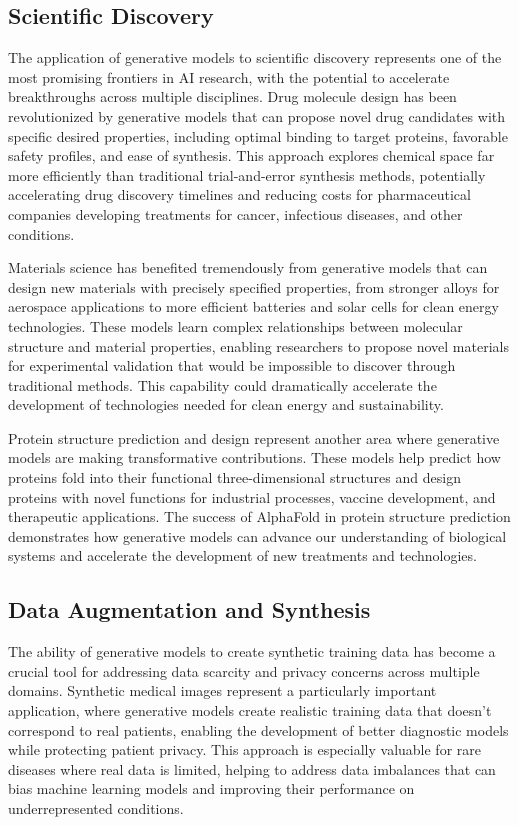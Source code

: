 \subsection{Scientific Discovery}

The application of generative models to scientific discovery represents one of the most promising frontiers in AI research, with the potential to accelerate breakthroughs across multiple disciplines. Drug molecule design has been revolutionized by generative models that can propose novel drug candidates with specific desired properties, including optimal binding to target proteins, favorable safety profiles, and ease of synthesis. This approach explores chemical space far more efficiently than traditional trial-and-error synthesis methods, potentially accelerating drug discovery timelines and reducing costs for pharmaceutical companies developing treatments for cancer, infectious diseases, and other conditions.

Materials science has benefited tremendously from generative models that can design new materials with precisely specified properties, from stronger alloys for aerospace applications to more efficient batteries and solar cells for clean energy technologies. These models learn complex relationships between molecular structure and material properties, enabling researchers to propose novel materials for experimental validation that would be impossible to discover through traditional methods. This capability could dramatically accelerate the development of technologies needed for clean energy and sustainability.

Protein structure prediction and design represent another area where generative models are making transformative contributions. These models help predict how proteins fold into their functional three-dimensional structures and design proteins with novel functions for industrial processes, vaccine development, and therapeutic applications. The success of AlphaFold in protein structure prediction demonstrates how generative models can advance our understanding of biological systems and accelerate the development of new treatments and technologies.

\subsection{Data Augmentation and Synthesis}

The ability of generative models to create synthetic training data has become a crucial tool for addressing data scarcity and privacy concerns across multiple domains. Synthetic medical images represent a particularly important application, where generative models create realistic training data that doesn't correspond to real patients, enabling the development of better diagnostic models while protecting patient privacy. This approach is especially valuable for rare diseases where real data is limited, helping to address data imbalances that can bias machine learning models and improving their performance on underrepresented conditions.

